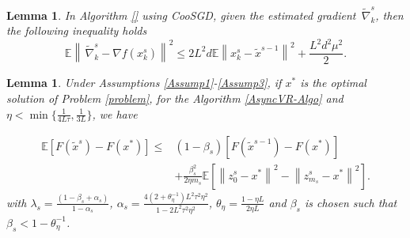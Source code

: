 \documentclass{article}
\newcommand*{\E}{\mathbb{E}}
\newcommand*{\VRG}{\,\widetilde{\nabla}_k^s}
\newcommand{\norm}[1]{\left\lVert#1\right\rVert}
\newtheorem{lemma}[theorem]{Lemma}
\theoremstyle{definition}
\theoremstyle{remark}
\begin{document}
\begin{lemma}
In Algorithm \ref{} using CooSGD, given the estimated gradient $\VRG$, then the following inequality holds 
\begin{equation}
\E\norm{\VRG - \nabla f(x_k^s)}^2\leq 2 L^2d \E\norm{x_k^s-\widetilde{x}^{s-1}}^2+\frac{L^2d^2\mu^2}{2}.
\end{equation}
\end{lemma}
\begin{lemma}\label{lemma1}
Under Assumptions \ref{Assump1}-\ref{Assump3}, if $x^*$ is the optimal solution of Problem \eqref{problem}, for the Algorithm \ref{AsyncVR-Algo} and $\eta < \min\{\frac{1}{4L
\tau}, \frac{1}{3L}\}$, we have 

\begin{equation}
\begin{split}
\E[F(\widetilde{x}^s)-F(x^*)] \leq &(1-\beta_s)[F(\widetilde{x}^{s-1})-F(x^*)] \\
&+ {\frac{ \beta_s^2}{2\eta m_s}}\E[\norm{z_{0}^s-x^*}^2-\norm{z_{m_s}^s-x^*}^2]. 
\end{split}
\end{equation}
with $\lambda_s = \frac{(1-\beta_s+\alpha_s)}{1-\alpha_s}$, $\alpha_s=\frac{4(2+\theta_{\eta}^{-1})L^2\tau^2\eta^2}{1-2L^2 \tau^2\eta^2}$, $\theta_{\eta} = \frac{1-\eta L}{2\eta L}$ and $\beta_s$ is chosen such that $\beta_s < 1-\theta_{\eta}^{-1}$.
\end{lemma}
\end{document}
